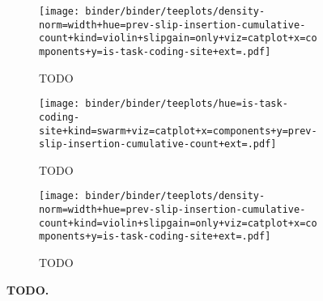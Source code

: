 \begin{figure*}

\begin{subfigure}{0.5\textwidth}
\texttt{[image: binder/binder/teeplots/density-norm=width+hue=prev-slip-insertion-cumulative-count+kind=violin+slipgain=only+viz=catplot+x=components+y=is-task-coding-site+ext=.pdf]}
\caption{%
\footnotesize
TODO
}
\end{subfigure}%
\begin{subfigure}{0.5\textwidth}
\texttt{[image: binder/binder/teeplots/hue=is-task-coding-site+kind=swarm+viz=catplot+x=components+y=prev-slip-insertion-cumulative-count+ext=.pdf]}
\caption{%
\footnotesize
TODO
}
\end{subfigure}

\begin{subfigure}{0.5\textwidth}
\texttt{[image: binder/binder/teeplots/density-norm=width+hue=prev-slip-insertion-cumulative-count+kind=violin+slipgain=only+viz=catplot+x=components+y=is-task-coding-site+ext=.pdf]}
\caption{%
\footnotesize
TODO
}
\end{subfigure}

\caption{%
\textbf{TODO.}
}
\label{fig:potentiation-supp}
\end{figure*}



